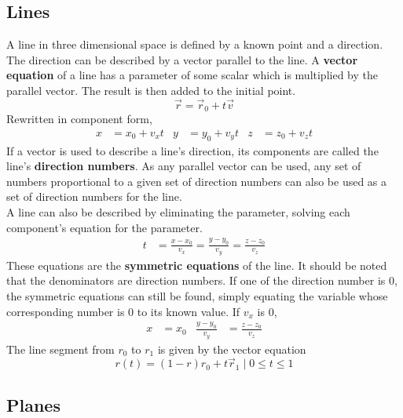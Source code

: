 \documentclass[../Calculus_\Roman{3}]{subfiles}
\begin{document}
					\subsection*{Lines}
						A line in three dimensional space is defined by a known point and a direction. The direction can be described by a vector parallel to the line. A \textbf{vector equation} of a line has a parameter of some scalar which is multiplied by the parallel vector. The result is then added to the initial point.
						\[\vec{r} = \vec{r}_0 + t\vec{v}\]
						Rewritten in component form,
							\begin{align*}
								x &= x_0 + v_xt & y &= y_0 + v_yt & z &= z_0 + v_zt
							\end{align*}
						If a vector is used to describe a line's direction, its components are called the line's \textbf{direction numbers}. As any parallel vector can be used, any set of numbers proportional to a given set of direction numbers can also be used as a set of direction numbers for the line. \\
						A line can also be described by eliminating the parameter, solving each component's equation for the parameter.\
						\begin{align*}
							t &= \frac{x - x_0}{v_x} = \frac{y - y_0}{v_y} = \frac{z - z_0}{v_z}
						\end{align*}
						These equations are the \textbf{symmetric equations} of the line. It should be noted that the denominators are direction numbers. If one of the direction number is 0, the symmetric equations can still be found, simply equating the variable whose corresponding number is 0 to its known value. If $v_x$ is 0,
							\begin{align*}
								x &= x_0 & \frac{y - y_0}{v_y} &= \frac{z - z_0}{v_z}
							\end{align*}
						The line segment from $r_0$ to $r_1$ is given by the vector equation
							\[r(t) = (1 - r)r_0 + t\vec{r}_1 \mid 0 \le t \le 1\]
					\subsection*{Planes}
\end{document}
